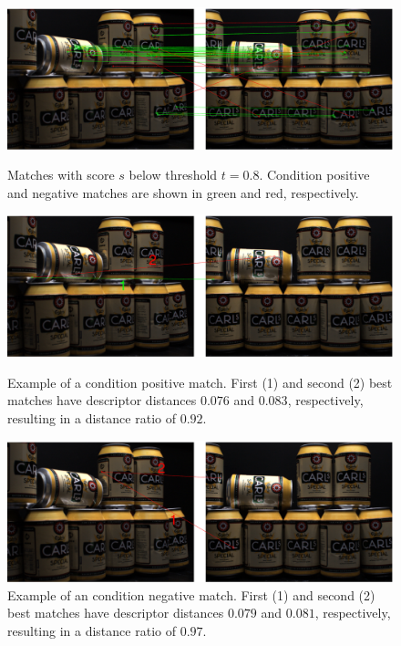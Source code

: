 \documentclass[thesis.tex]{subfiles}
\begin{document}
\begin{figure}[p]
	\centerline{\includegraphics[width=1.1\textwidth]{img/imageCorrespondenceMatches.pdf}}
	\caption{Matches with score $s$ below threshold $t = 0.8$. Condition positive and negative matches are shown in green and red, respectively.}
	\label{fig:imageCorrespondenceMatches}
	\vspace{5mm}
	\centerline{\includegraphics[width=1.1\textwidth]{img/imageCorrespondenceCorrectMatch.pdf}}
	\caption{Example of a condition positive match. First (1) and second (2) best matches have descriptor distances $0.076$ and $0.083$, respectively, resulting in a distance ratio of $0.92$.}
	\label{fig:imageCorrespondenceCorrectMatch}
	\vspace{5mm}
	\centerline{\includegraphics[width=1.1\textwidth]{img/imageCorrespondenceIncorrectMatch.pdf}}
	\caption{Example of an condition negative match. First (1) and second (2) best matches have descriptor distances $0.079$ and $0.081$, respectively, resulting in a distance ratio of $0.97$.}
	\label{fig:imageCorrespondenceIncorrectMatch}
\end{figure}
\end{document}
